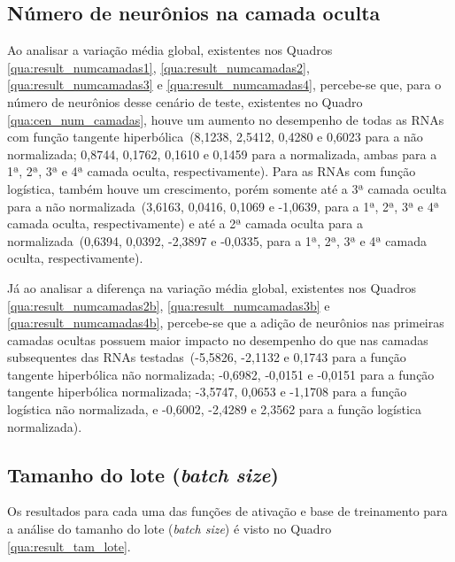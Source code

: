 \documentclass[12pt,oneside,a4paper,chapter=TITLE,section=TITLE,sumario
		=tradicional]{abntex2}
\begin{document}
		\subsection{Número de neurônios na camada oculta}
		
		Ao analisar a variação média global, existentes nos Quadros \ref{qua:result_numcamadas1}, \ref{qua:result_numcamadas2}, \ref{qua:result_numcamadas3} e \ref{qua:result_numcamadas4}, percebe-se que, para o número de neurônios desse cenário de teste, existentes no Quadro \ref{qua:cen_num_camadas}, houve um aumento no desempenho de todas as RNAs com função tangente hiperbólica~(8,1238, 2,5412, 0,4280 e 0,6023 para a não normalizada; 0,8744, 0,1762, 0,1610 e 0,1459 para a normalizada, ambas para a 1ª, 2ª, 3ª e 4ª camada oculta, respectivamente). Para as RNAs com função logística, também houve um crescimento, porém somente até a 3ª camada oculta para a não normalizada~(3,6163, 0,0416, 0,1069 e -1,0639, para a 1ª, 2ª, 3ª e 4ª camada oculta, respectivamente) e até a 2ª camada oculta para a normalizada~(0,6394, 0,0392, -2,3897 e -0,0335, para a 1ª, 2ª, 3ª e 4ª camada oculta, respectivamente).
			
		Já ao analisar a diferença na variação média global, existentes nos Quadros \ref{qua:result_numcamadas2b}, \ref{qua:result_numcamadas3b} e \ref{qua:result_numcamadas4b}, percebe-se que a adição de neurônios nas primeiras camadas ocultas possuem maior impacto no desempenho do que nas camadas subsequentes das RNAs testadas~(-5,5826, -2,1132 e 0,1743 para a função tangente hiperbólica não normalizada; -0,6982, -0,0151 e -0,0151 para a função tangente hiperbólica normalizada; -3,5747, 0,0653 e -1,1708 para a função logística não normalizada, e -0,6002, -2,4289 e 2,3562 para a função logística normalizada).
		
		\subsection{Tamanho do lote (\textit{batch size})}
		
		Os resultados para cada uma das funções de ativação e base de treinamento para a análise do tamanho do lote (\textit{batch size}) é visto no Quadro \ref{qua:result_tam_lote}.
		
\end{document}
